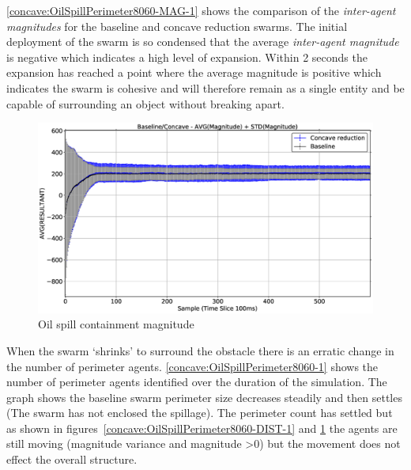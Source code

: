 \autoref{concave:OilSpillPerimeter8060-MAG-1} shows the comparison of the \textit{inter-agent magnitudes} for the baseline and concave reduction swarms. The initial deployment of the swarm is so condensed that the average \textit{inter-agent magnitude} is negative which indicates a high level of expansion. Within 2 seconds the expansion has reached a point where the average magnitude is positive which indicates the swarm is cohesive and will therefore remain as a single entity and be capable of surrounding an object without breaking apart.
\begin{figure}[H]
\begin{center}
\includegraphics[width=14cm]{CHAPTER-7/figures/OilSpillPerimeter8060-MAG-1}
\end{center}
\caption{Oil spill containment magnitude\label{concave:OilSpillPerimeter8060-MAG-1}}
\end{figure}

When the swarm `shrinks' to surround the obstacle there is an erratic change in the number of perimeter agents. \autoref{concave:OilSpillPerimeter8060-1} shows the number of perimeter agents identified over the duration of the simulation. The graph shows the baseline swarm perimeter size decreases steadily and then settles (The swarm has not enclosed the spillage). The perimeter count has settled but as shown in figures~\autoref{concave:OilSpillPerimeter8060-DIST-1} and \ref{concave:OilSpillPerimeter8060-MAG-1} the agents are still moving (magnitude variance and magnitude \textgreater 0) but the movement does not effect the overall structure. 

